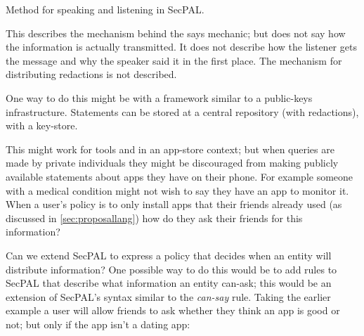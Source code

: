 \documentclass[a4paper,sfsidenotes]{%
  scrartcl%
}
\begin{document}
\begin{marginfigure}
  \begin{algorithm}[H]
    \;

  \end{algorithm}
  \caption{Method for speaking and listening in SecPAL.}
  \label{alg:speaking}
\end{marginfigure}

This describes the mechanism behind the says mechanic; but does not say how the
information is actually transmitted.  It does not describe how the listener gets
the message and why the speaker said it in the first place.
The mechanism for distributing redactions is not described. 

One way to do this
might be with a framework similar to a public-keys infrastructure.
Statements can be stored at a central repository (with redactions), with a
key-store.  

This might work for tools and in an app-store context; but when queries are made
by private individuals they might be discouraged from making publicly available
statements about apps they have on their phone.  For example someone with a
medical condition might not wish to say they have an app to monitor it.  When a
user's policy is to only install apps that their friends already used (as
discussed in \autoref{sec:proposallang}) how do they ask their friends for
this information?  

Can we extend SecPAL to express a policy that decides when an
entity will distribute information?
One possible way to do this would be to add rules to SecPAL that describe what
information an entity can-ask; this would be an extension of SecPAL's syntax
similar to the \emph{can-say} rule.  Taking the earlier example a user will allow
friends to ask whether they think an app is good or not; but only if the app
isn't a dating app:
\end{document}
